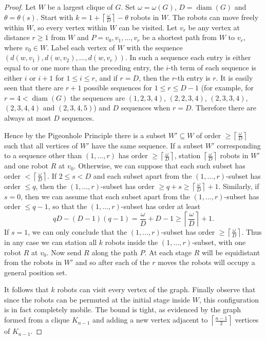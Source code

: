 \documentclass[a4paper,12pt]{article}
\DeclareMathOperator{\diam}{diam}
\theoremstyle{definition}
\begin{document}
	\begin{proof}
		Let $W$ be a largest clique of $G$. Set $\omega = \omega (G)$, $D = \diam (G)$ and $\theta = \theta (s)$. Start with $k = 1+\left \lceil \frac{\omega }{D} \right \rceil -\theta $ robots in $W$. The robots can move freely within $W$, so every vertex within $W$ can be visited. Let $v_r$ be any vertex at distance $r \geq 1$ from $W$ and $P = v_0,v_1,\dots ,v_r$ be a shortest path from $W$ to $v_r$, where $v_0 \in W$. Label each vertex of $W$ with the sequence $(d(w,v_1),d(w,v_2),\dots ,d(w,v_r))$. In such a sequence each entry is either equal to or one more than the preceding entry, the $i$-th term of each sequence is either $i$ or $i+1$ for $1 \leq i \leq r$, and if $r = D$, then the $r$-th entry is $r$. It is easily seen that there are $r+1$ possible sequences for $1 \leq r \leq D-1$ (for example, for $r = 4 < \diam (G)$ the sequences are $(1,2,3,4)$, $(2,2,3,4)$, $(2,3,3,4)$, $(2,3,4,4)$ and $(2,3,4,5)$) and $D$ sequences when $r = D$. Therefore there are always at most $D$ sequences.
		
		Hence by the Pigeonhole Principle there is a subset $W' \subseteq W$ of order $\geq \left \lceil \frac{\omega }{D} \right \rceil $ such that all vertices of $W'$ have the same sequence. If a subset $W'$ corresponding to a sequence other than $(1,\dots ,r)$ has order $\geq \left \lceil \frac{\omega }{D} \right \rceil $, station $\left \lceil \frac{\omega }{D}\right \rceil $ robots in $W'$ and one robot $R$ at $v_0$. Otherwise, we can suppose that each such subset has order $< \left \lceil \frac{\omega }{D}\right \rceil$. If $2 \leq s < D$ and each subset apart from the $(1,\dots ,r)$-subset has order $\leq q$, then the $(1,\dots ,r)$-subset has order $\geq q+s \geq \left \lceil \frac{\omega }{D} \right \rceil +1$. Similarly, if $s = 0$, then we can assume that each subset apart from the $(1,\dots ,r)$-subset has order $\leq q-1$, so that the $(1,\dots ,r)$-subset has order at least \[ qD - (D-1)(q-1) = \frac{\omega }{D}+D-1 \geq \left \lceil \frac{\omega }{D}\right \rceil +1.\] If $s = 1$, we can only conclude that the $(1,\dots ,r)$-subset has order $\geq \left \lceil \frac{\omega }{D}\right \rceil $. Thus in any case we can station all $k$ robots inside the $(1,\dots ,r)$-subset, with one robot $R$ at $v_0$. Now send $R$ along the path $P$. At each stage $R$ will be equidistant from the robots in $W'$ and so after each of the $r$ moves the robots will occupy a general position set. 
		
		It follows that $k$ robots can visit every vertex of the graph. Finally observe that since the robots can be permuted at the initial stage inside $W$, this configuration is in fact completely mobile. The bound is tight, as evidenced by the graph formed from a clique $K_{n-1}$ and adding a new vertex adjacent to $\left \lceil \frac{n-1}{2} \right \rceil $ vertices of $K_{n-1}$.
		

\end{proof}
\end{document}
